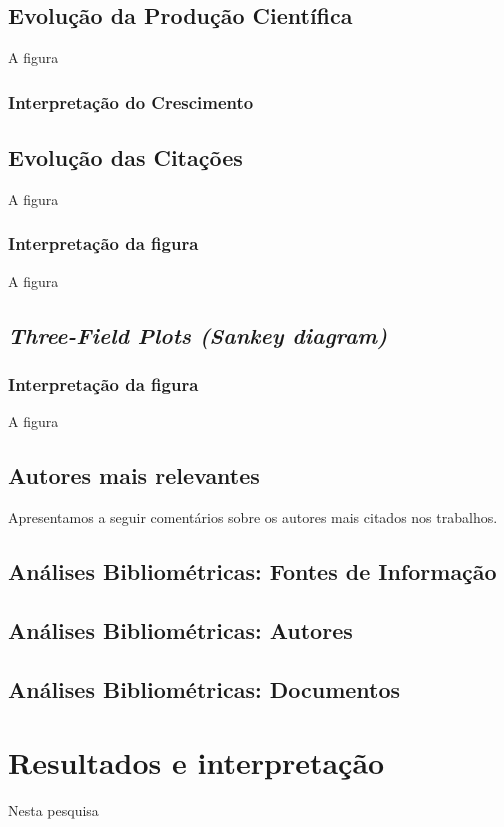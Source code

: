 \begin{description}
\end{description}

     
\subsection{Evolução da Produção Científica}
A figura 
     
\subsubsection{Interpretação do Crescimento}

\subsection{Evolução das Citações}
A figura

\subsubsection{Interpretação da figura}
A figura

\subsection{\textit{Three-Field Plots (Sankey diagram)}}

\subsubsection{Interpretação da figura}
A figura

\subsection{Autores mais relevantes}
Apresentamos a seguir comentários sobre os autores mais citados nos trabalhos.

\subsection{Análises Bibliométricas: Fontes de Informação}

\subsection{Análises Bibliométricas: Autores}

\subsection{Análises Bibliométricas: Documentos}



\section{Resultados e interpretação}
Nesta pesquisa 